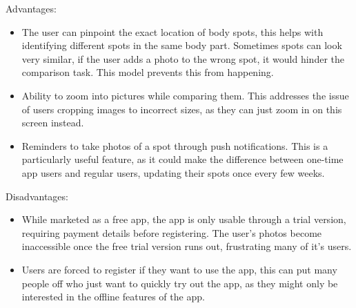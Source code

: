 Advantages:
\begin{itemize}
    \item The user can pinpoint the exact location of body spots, this helps with identifying different spots in the same body part. Sometimes spots can look very similar, if the user adds a photo to the wrong spot, it would hinder the comparison task. This model prevents this from happening.
    \item Ability to zoom into pictures while comparing them. This addresses the issue of users cropping images to incorrect sizes, as they can just zoom in on this screen instead.
    \item Reminders to take photos of a spot through push notifications. This is a particularly useful feature, as it could make the difference between one-time app users and regular users, updating their spots once every few weeks.
\end{itemize}

Disadvantages:
\begin{itemize}
    \item While marketed as a free app, the app is only usable through a trial version, requiring payment details before registering. The user's photos become inaccessible once the free trial version runs out, frustrating many of it's users.
    \item Users are forced to register if they want to use the app, this can put many people off who just want to quickly try out the app, as they might only be interested in the offline features of the app.
\end{itemize}

